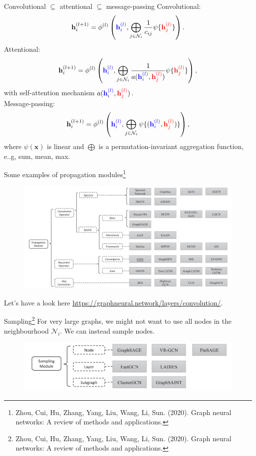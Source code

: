\documentclass{beamer}
\begin{document}
\begin{frame}{Convolutional $\subseteq$ attentional $\subseteq$ message-passing}
Convolutional:
\[
\mathbf{h}_i^{(l+1)}=\phi^{(l)}\left({\color{blue}\mathbf{h}_i^{(l)}},\bigoplus_{j\in\mathcal{N}_i}\frac{1}{c_{ij}}\psi\{{\color{red}\mathbf{h}_j^{(l)}}\}\right).
\]
Attentional:
\[
\mathbf{h}_i^{(l+1)}=\phi^{(l)}\left({\color{blue}\mathbf{h}_i^{(l)}},\bigoplus_{j\in\mathcal{N}_i}\frac{1}{a({\color{blue}\mathbf{h}_i^{(l)}},{\color{red}\mathbf{h}_j^{(l)}})}\psi\{{\color{red}\mathbf{h}_j^{(l)}}\}\right),
\]
with self-attention mechanism $a({\color{blue}\mathbf{h}_i^{(l)}},{\color{red}\mathbf{h}_j^{(l)}})$.\\
Message-passing:
\[
\mathbf{h}_i^{(l+1)}=\phi^{(l)}\left({\color{blue}\mathbf{h}_i^{(l)}},\bigoplus_{j\in\mathcal{N}_i}\psi\{({\color{blue}\mathbf{h}_i^{(l)}},{\color{red}\mathbf{h}_j^{(l)}})\}\right),
\]
where $\psi(\mathbf{x})$ is linear and $\bigoplus$ is a permutation-invariant aggregation function, e..g, sum, mean, max.

\end{frame}
\begin{frame}{Some examples of propagation modules\footnote{Zhou, Cui, Hu, Zhang, Yang, Liu, Wang, Li, Sun. (2020).
Graph neural networks: A review of methods and applications.}}
\begin{figure}
\includegraphics[width=0.85\linewidth]{Images/GNN-variants.jpg}
\end{figure}
Let's have a look here \url{https://graphneural.network/layers/convolution/}.
\end{frame}
\begin{frame}{Sampling\footnote{Zhou, Cui, Hu, Zhang, Yang, Liu, Wang, Li, Sun. (2020).
Graph neural networks: A review of methods and applications.}}
For very large graphs, we might not want to use all nodes in the neighbourhood $\mathcal{N}_i$. We can instead sample nodes.
\begin{figure}
\includegraphics[width=0.85\linewidth]{Images/GNN_sampling.jpg}
\end{figure}
\end{frame}
\end{document}

